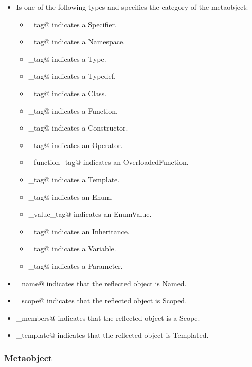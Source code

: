 \begin{itemize}
\item{\verb@category@} Is one of the following types and specifies the category
of the metaobject:
	\begin{itemize}
		\item{\verb@specifier_tag@} indicates a {\metaobject Specifier}.
		\item{\verb@namespace_tag@} indicates a {\metaobject Namespace}.
		\item{\verb@type_tag@} indicates a {\metaobject Type}.
		\item{\verb@typedef_tag@} indicates a {\metaobject Typedef}.
		\item{\verb@class_tag@} indicates a {\metaobject Class}.
		\item{\verb@function_tag@} indicates a {\metaobject Function}.
		\item{\verb@constructor_tag@} indicates a {\metaobject Constructor}.
		\item{\verb@operator_tag@} indicates an {\metaobject Operator}.
		\item{\verb@overloaded_function_tag@} indicates an {\metaobject OverloadedFunction}.
		\item{\verb@template_tag@} indicates a {\metaobject Template}.
		\item{\verb@enum_tag@} indicates an {\metaobject Enum}.
		\item{\verb@enum_value_tag@} indicates an {\metaobject EnumValue}.
		\item{\verb@inheritance_tag@} indicates an {\metaobject Inheritance}.
		\item{\verb@variable_tag@} indicates a {\metaobject Variable}.
		\item{\verb@parameter_tag@} indicates a {\metaobject Parameter}.
	\end{itemize}

\item{\verb@has_name@} indicates that the reflected object is {\metaobject Named}.
\item{\verb@has_scope@} indicates that the reflected object is {\metaobject Scoped}.
\item{\verb@has_members@} indicates that the reflected object is a {\metaobject Scope}.
\item{\verb@has_template@} indicates that the reflected object is {\metaobject Templated}.
\end{itemize}

\subsubsection{Metaobject}

